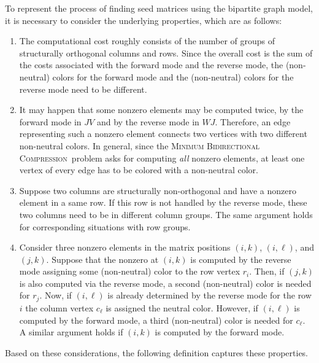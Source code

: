 \documentclass[12pt, twoside,a4paper,toc=bibliography]{scrbook}
\newcommand{\MinBidCom}{\textsc{Minimum Bidirectional Compression}}
\begin{document}
To represent the process of finding seed matrices using the bipartite graph model, it is
necessary to consider the underlying properties, which are as follows:
\begin{enumerate}
\item The computational cost roughly consists of the number of groups of structurally orthogonal columns and
rows. Since the overall cost is the sum of the costs associated with the forward mode
and the reverse mode, the (non-neutral) colors for the forward mode and the
(non-neutral) colors for the reverse mode need to be different.

\item It may happen that some nonzero
elements may be computed twice, by the forward mode in $JV$ and by the reverse mode
in $WJ$. Therefore, an edge representing such a nonzero element connects two
vertices with two different non-neutral colors. In general, since the
\MinBidCom~problem asks for computing \emph{all} nonzero elements, at least one vertex of
every edge has to be colored with a non-neutral color.

\item Suppose two columns are structurally non-orthogonal and have a nonzero element in a
same row. If this row is not handled by the reverse mode, these two columns need to
be in different column groups. The same argument holds for corresponding situations
with row groups.

\item Consider three nonzero elements in the matrix positions $(i,k)$, $(i,\ell)$, and
$(j,k)$. Suppose that the nonzero at $(i,k)$ is computed by the reverse mode
assigning some (non-neutral) color to the row vertex $r_i$. Then, if $(j,k)$ is
also computed via the reverse mode, a second (non-neutral) color is needed for
$r_j$. Now, if $(i,\ell)$ is already determined by the reverse mode for the row $i$ the
column vertex $c_\ell$ is assigned the neutral color. However, if $(i,\ell)$ is
computed by the forward mode, a third (non-neutral) color is needed for $c_\ell$. A
similar argument holds if $(i,k)$ is computed by the forward mode.
\end{enumerate}

Based on these considerations, the following definition captures these properties.
\end{document}
